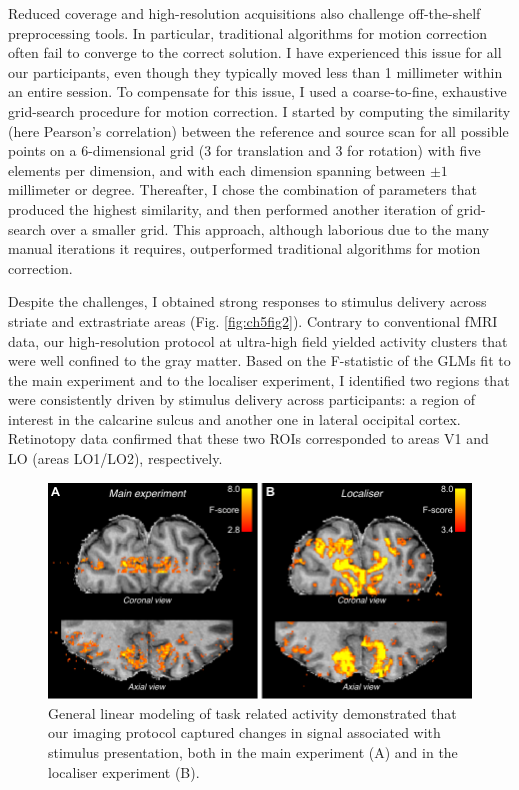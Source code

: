 Reduced coverage and high-resolution acquisitions also challenge off-the-shelf preprocessing tools. In particular, traditional algorithms for motion correction often fail to converge to the correct solution. I have experienced this issue for all our participants, even though they typically moved less than 1 millimeter within an entire session. To compensate for this issue, I used a coarse-to-fine, exhaustive grid-search procedure for motion correction. I started by computing the similarity (here Pearson's correlation) between the reference and source scan for all possible points on a 6-dimensional grid (3 for translation and 3 for rotation) with five elements per dimension, and with each dimension spanning between $\pm 1$ millimeter or degree. Thereafter, I chose the combination of parameters that produced the highest similarity, and then performed another iteration of grid-search over a smaller grid. This approach, although laborious due to the many manual iterations it requires, outperformed traditional algorithms for motion correction.

Despite the challenges, I obtained strong responses to stimulus delivery across striate and extrastriate areas (Fig. \ref{fig:ch5fig2}). Contrary to conventional fMRI data, our high-resolution protocol at ultra-high field yielded activity clusters that were well confined to the gray matter. Based on the F-statistic of the GLMs fit to the main experiment and to the localiser experiment, I identified two regions that were consistently driven by stimulus delivery across participants: a region of interest in the calcarine sulcus and another one in lateral occipital cortex. Retinotopy data confirmed that these two ROIs corresponded to areas V1 and LO (areas LO1/LO2), respectively.

\begin{figure}
  \centering
  \includegraphics[keepaspectratio]{Fig3.pdf}
  \caption[General linear modeling of stimulus related activity.]{General linear modeling of task related activity demonstrated that our imaging protocol captured changes in signal associated with stimulus presentation, both in the main experiment (A) and in the localiser experiment (B).}
  \label{fig:ch5fig3}
\end{figure}

